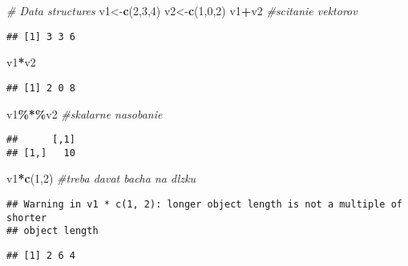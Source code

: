 \documentclass[
]{article}
\newenvironment{Shaded}{\begin{snugshade}}{\end{snugshade}}
\newcommand{\CommentTok}[1]{\textcolor[rgb]{0.56,0.35,0.01}{\textit{#1}}}
\newcommand{\DecValTok}[1]{\textcolor[rgb]{0.00,0.00,0.81}{#1}}
\newcommand{\FunctionTok}[1]{\textcolor[rgb]{0.13,0.29,0.53}{\textbf{#1}}}
\newcommand{\NormalTok}[1]{#1}
\newcommand{\OtherTok}[1]{\textcolor[rgb]{0.56,0.35,0.01}{#1}}
\newcommand{\SpecialCharTok}[1]{\textcolor[rgb]{0.81,0.36,0.00}{\textbf{#1}}}
\begin{document}
\begin{Shaded}
\begin{Highlighting}[]
\CommentTok{\# Data structures}
\NormalTok{v1}\OtherTok{\textless{}{-}}\FunctionTok{c}\NormalTok{(}\DecValTok{2}\NormalTok{,}\DecValTok{3}\NormalTok{,}\DecValTok{4}\NormalTok{)}
\NormalTok{v2}\OtherTok{\textless{}{-}}\FunctionTok{c}\NormalTok{(}\DecValTok{1}\NormalTok{,}\DecValTok{0}\NormalTok{,}\DecValTok{2}\NormalTok{)}
\NormalTok{v1}\SpecialCharTok{+}\NormalTok{v2 }\CommentTok{\#scitanie vektorov}
\end{Highlighting}
\end{Shaded}

\begin{verbatim}
## [1] 3 3 6
\end{verbatim}

\begin{Shaded}
\begin{Highlighting}[]
\NormalTok{v1}\SpecialCharTok{*}\NormalTok{v2}
\end{Highlighting}
\end{Shaded}

\begin{verbatim}
## [1] 2 0 8
\end{verbatim}

\begin{Shaded}
\begin{Highlighting}[]
\NormalTok{v1}\SpecialCharTok{\%*\%}\NormalTok{v2 }\CommentTok{\#skalarne nasobanie}
\end{Highlighting}
\end{Shaded}

\begin{verbatim}
##      [,1]
## [1,]   10
\end{verbatim}

\begin{Shaded}
\begin{Highlighting}[]
\NormalTok{v1}\SpecialCharTok{*}\FunctionTok{c}\NormalTok{(}\DecValTok{1}\NormalTok{,}\DecValTok{2}\NormalTok{) }\CommentTok{\#treba davat bacha na dlzku}
\end{Highlighting}
\end{Shaded}

\begin{verbatim}
## Warning in v1 * c(1, 2): longer object length is not a multiple of shorter
## object length
\end{verbatim}

\begin{verbatim}
## [1] 2 6 4
\end{verbatim}
\end{document}
